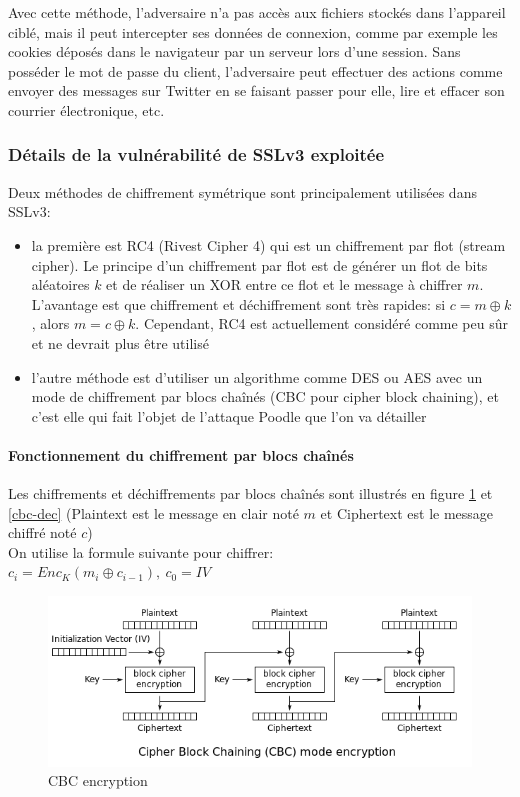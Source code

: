Avec cette méthode, l'adversaire n’a pas accès aux fichiers stockés dans l’appareil ciblé, mais il peut intercepter ses données de connexion, comme par exemple les cookies déposés dans le navigateur par un serveur lors d’une session. Sans posséder le mot de passe du client, l'adversaire peut effectuer des actions comme envoyer des messages sur Twitter en se faisant passer pour elle, lire et effacer son courrier électronique, etc.

\subsubsection{Détails de la vulnérabilité de SSLv3 exploitée}

Deux méthodes de chiffrement symétrique sont principalement utilisées dans SSLv3:
\begin{itemize}
\item la première est RC4 (Rivest Cipher 4) qui est un chiffrement par flot (stream cipher). Le principe d'un chiffrement par flot est de générer un flot de bits aléatoires $k$ et de réaliser un XOR entre ce flot et le message à chiffrer $m$. L'avantage est que chiffrement et déchiffrement sont très rapides: si $c = m \oplus k$, alors $m = c \oplus k$. Cependant, RC4 est actuellement considéré comme peu s\^ur et ne devrait plus \^etre utilisé
\item l'autre méthode est d'utiliser un algorithme comme DES ou AES avec un mode de chiffrement par blocs cha\^inés (CBC pour cipher block chaining), et c'est elle qui fait l'objet de l'attaque Poodle que l'on va détailler
\end{itemize}

\paragraph{Fonctionnement du chiffrement par blocs cha\^inés}

Les chiffrements et déchiffrements par blocs cha\^inés sont illustrés en figure \ref{cbc-enc} et \ref{cbc-dec} (Plaintext est le message en clair noté $m$ et Ciphertext est le message chiffré noté $c$) \\

\noindent On utilise la formule suivante pour chiffrer: \\
$c_i = Enc_K(m_i \oplus c_{i-1}),\ c_0 = IV$

\begin{figure}[H]
\includegraphics[scale=0.6]{img/cbc-enc.png}
\caption{CBC encryption}
\label{cbc-enc}
\end{figure}

